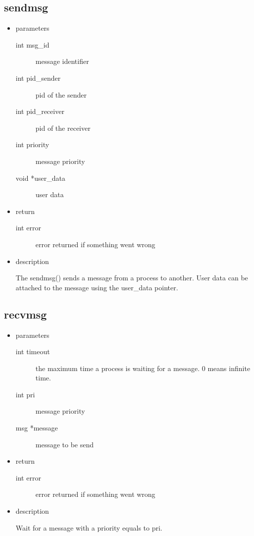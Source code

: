 \subsection{sendmsg}
\begin{itemize}
\item{parameters}
\begin{description}
	\item[int msg\_id] message identifier
	\item[int pid\_sender] pid of the sender
	\item[int pid\_receiver] pid of the receiver
	\item[int priority] message priority
	\item[void *user\_data] user data
\end{description}
\item{return}
\begin{description}
	\item[int error] error returned if something went wrong 
\end{description}
\item{description}

The sendmsg() sends a message from a process to another.
User data can be attached to the message using the user\_data pointer.
\end{itemize}

\subsection{recvmsg}
\begin{itemize}
\item{parameters}
\begin{description}
	\item[int timeout] the maximum time a process is waiting for a message. 0 means infinite time.
	\item[int pri] message priority
	\item[msg *message] message to be send
\end{description}
\item{return}
\begin{description}
	\item[int error] error returned if something went wrong 
\end{description}
\item{description}

Wait for a message with a priority equals to pri.
\end{itemize}


